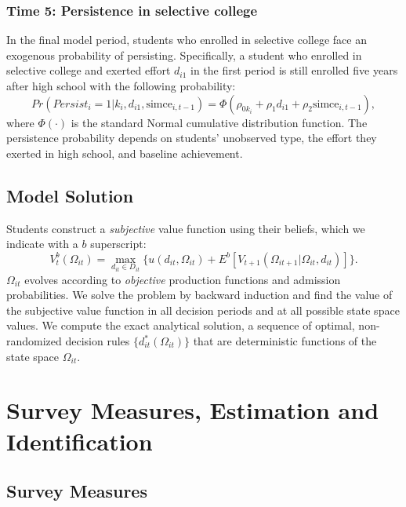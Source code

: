 \subsubsection{Time 5: Persistence in selective college}
In the final model period, students who enrolled in selective college face an exogenous probability of persisting. Specifically, a student who enrolled in selective college and exerted effort $d_{i1}$ in the first period is still enrolled five years after high school with the following probability:
\begin{equation}\label{eq:ppersist}
    Pr(Persist_i=1|k_i,d_{i1},\mbox{simce}_{i,t-1})=\Phi(\rho_{0k_i}+\rho_1 d_{i1}+\rho_2 \mbox{simce}_{i,t-1}  ),
\end{equation}
\noindent where $\Phi(\cdot)$ is the standard Normal cumulative distribution function. The persistence probability depends on students' unobserved type, the effort they exerted in high school, and baseline achievement. \par 


\subsection{Model Solution}\label{sec:solution}
Students construct a {\itshape subjective} value function using their beliefs, which we indicate with a $b$ superscript:
\vspace{-10pt}
\begin{equation}\label{eq:sol}
	V^b_t\left(\Omega_{it}\right)= \max_{d_{it}\in D_{it}} \big\{ u(d_{it},\Omega_{it})+E^b\left[V_{t+1}\left(\Omega_{it+1}|\Omega_{it},d_{it}\right)\right]\big\}.
\end{equation}
\noindent $\Omega_{it}$ evolves according to {\itshape objective} production functions and admission probabilities. We solve the problem by backward induction and find the value of the subjective value function in all decision periods and at all possible state space values. We compute the exact analytical solution, a sequence of optimal, non-randomized decision rules $\{d_{it}^{*}(\Omega_{it})\}$ that are deterministic functions of the state space $\Omega_{it}$.


\section{Survey Measures, Estimation and Identification}\label{sec:surveyidentest}

\subsection{Survey Measures}\label{sec:measurements}


